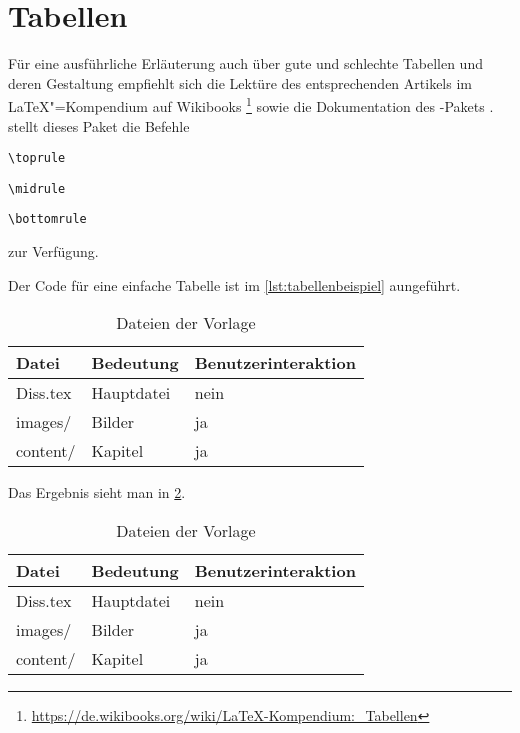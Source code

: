 \section{Tabellen}%
\label{sec:Tabellen}
Für eine ausführliche Erläuterung auch über gute und schlechte Tabellen
und deren Gestaltung empfiehlt sich die Lektüre des entsprechenden Artikels im \LaTeX{}"=Kompendium auf Wikibooks%
\footnote{\url{https://de.wikibooks.org/wiki/LaTeX-Kompendium:_Tabellen}}
sowie die Dokumentation des -Pakets \cite{Fear2005}.
\Ua stellt dieses Paket die Befehle
\begin{itemize*}
	\item \lstinline|\toprule|
	\item \lstinline|\midrule|
	\item \lstinline|\bottomrule|
\end{itemize*}
zur Verfügung.

Der Code für eine einfache Tabelle ist im \cref{lst:tabellenbeispiel} aungeführt.

\begin{latex}[caption={Einfache Tabelle in \LaTeX},label={lst:tabellenbeispiel}]
\begin{table}%
	\centering%
	\begin{tabularx}{\columnwidth}{l l X}%
		\toprule%
		Datei       &  Bedeutung    &  Benutzerinteraktion \\%
		\midrule%
		Diss.tex  &  Hauptdatei   &  nein     \\%
		images/   &  Bilder       &  ja       \\%
		content/  &  Kapitel      &  ja       \\%
		\bottomrule%
	\end{tabularx}%
	\caption{Dateien der Vorlage}%
	\label{tab:tabellenbeispiel}%
\end{table}
\end{latex}

Das Ergebnis sieht man in \cref{tab:tabellenbeispiel}.

\begin{table}%
	\centering%
	\begin{tabular}{l l l}%
		\toprule%
		Datei       &  Bedeutung    &  Benutzerinteraktion \\%
		\midrule%
		Diss.tex  &  Hauptdatei   &  nein     \\%
		images/   &  Bilder       &  ja       \\%
		content/  &  Kapitel      &  ja       \\%
		\bottomrule%
	\end{tabular}%
	\caption{Dateien der Vorlage}%
	\label{tab:tabellenbeispiel}%
\end{table}

